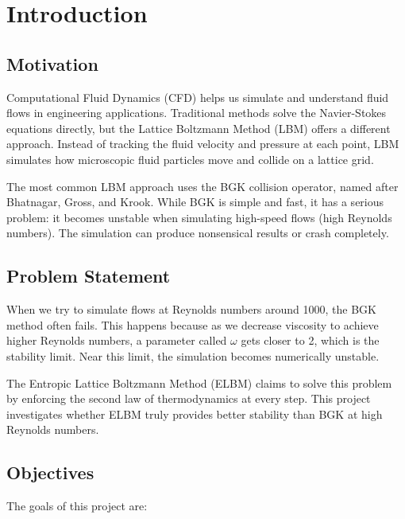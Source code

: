 \chapter{Introduction}

\section{Motivation}

Computational Fluid Dynamics (CFD) helps us simulate and understand fluid flows in engineering applications. Traditional methods solve the Navier-Stokes equations directly, but the Lattice Boltzmann Method (LBM) offers a different approach. Instead of tracking the fluid velocity and pressure at each point, LBM simulates how microscopic fluid particles move and collide on a lattice grid.

The most common LBM approach uses the BGK collision operator, named after Bhatnagar, Gross, and Krook. While BGK is simple and fast, it has a serious problem: it becomes unstable when simulating high-speed flows (high Reynolds numbers). The simulation can produce nonsensical results or crash completely.

\section{Problem Statement}

When we try to simulate flows at Reynolds numbers around 1000, the BGK method often fails. This happens because as we decrease viscosity to achieve higher Reynolds numbers, a parameter called $\omega$ gets closer to 2, which is the stability limit. Near this limit, the simulation becomes numerically unstable.

The Entropic Lattice Boltzmann Method (ELBM) claims to solve this problem by enforcing the second law of thermodynamics at every step. This project investigates whether ELBM truly provides better stability than BGK at high Reynolds numbers.

\section{Objectives}

The goals of this project are:

